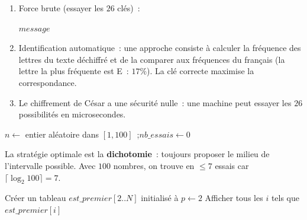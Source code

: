
\begin{enumerate}
  \item Force brute (essayer les $26$ cl\'es)~:
\begin{algorithm}[H]
\caption{Attaque par force brute}
\Lire $\mathit{message}$\;
\end{algorithm}
  \item Identification automatique~: une approche consiste \`a calculer la
        fr\'equence des lettres du texte d\'echiffr\'e et de la comparer
        aux fr\'equences du fran\c cais (la lettre la plus fr\'equente est \og E\fg~:
        $17\%$). La cl\'e correcte maximise la correspondance.
  \item Le chiffrement de C\'esar a une s\'ecurit\'e nulle~: une machine peut essayer
        les $26$ possibilit\'es en microsecondes.
\end{enumerate}


\begin{algorithm}[H]
\caption{Jeu du plus/moins}
$n \leftarrow$ entier al\'eatoire dans $[1,100]$~;\quad $\mathit{nb\_essais} \leftarrow 0$\;
\end{algorithm}

La strat\'egie optimale est la \textbf{dichotomie}~: toujours proposer le milieu
de l'intervalle possible. Avec $100$ nombres, on trouve en $\leq7$ essais
car $\lceil\log_2 100\rceil=7$.


\begin{algorithm}[H]
\caption{Crible d'\'Eratosth\`ene}
Cr\'eer un tableau $\mathit{est\_premier}[2..N]$ initialis\'e \`a \Vrai\;
$p \leftarrow 2$\;
Afficher tous les $i$ tels que $\mathit{est\_premier}[i]$\;
\end{algorithm}

